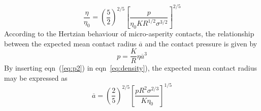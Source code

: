 \documentclass[pre,groupedaddress,showkeys,showpacs,twocolumn]{revtex4}
\begin{document}
%
\begin{equation}
	\frac{\eta}{\eta_0}=\left ( \frac{5}{2} \right )^{2/5}\left [ \frac{p}{\eta_0KR^{1/2}\sigma^{3/2}} \right ]^{2/5}
	\label{eq:density}
\end{equation}
%
According to the Hertzian behaviour of micro-asperity contacts, the relationship between the expected mean contact radius $\overline{a}$ and the contact pressure is given by
%
\begin{equation}
	p=\frac{K}{R}\eta \overline{a}^3
	\label{eq:p2}
\end{equation}
By inserting eqn~(\ref{eq:p2}) in eqn~\ref{eq:density}), the expected mean contact radius may be expressed as
%
\begin{equation}
	\overline{a}=\left ( \frac{2}{5} \right )^{2/5}\left [ \frac{pR^2\sigma^{2/3}}{K\eta_0} \right ]^{1/5}
	\label{eq:radius}
\end{equation}

%

	
	
	
\end{document}
